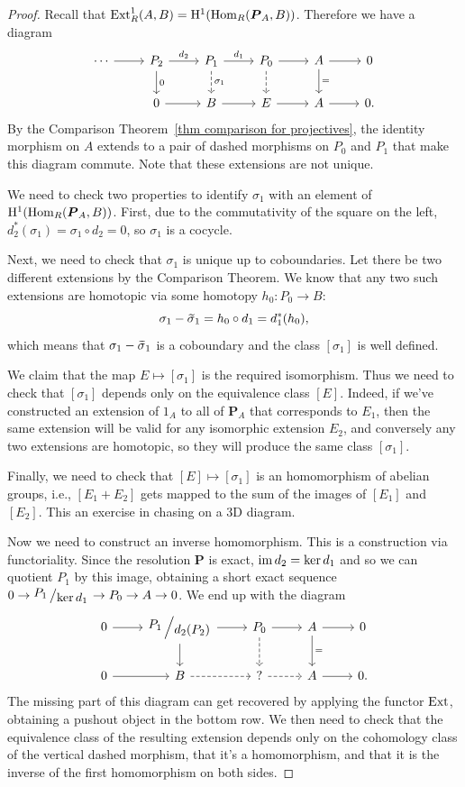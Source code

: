 \begin{proof}
    Recall that $\operatorname{Ext}^1_R(A,B)=\mathrm{H}^1(\operatorname{Hom}_R(\boldsymbol{P}_A,B))$. Therefore we have a diagram
    \[\begin{tikzcd}
        \cdots \arrow[r]&P_2\arrow[r,"d_2"]\arrow[d,"0"] & P_1\arrow[r,"d_1"]\arrow[d,dashed,"\sigma_1"] & P_0 \arrow[r]\arrow[d,dashed] & A\arrow[r]\arrow[d,"="] & 0 \\
        & 0\arrow[r] & B\arrow[r] & E \arrow[r] & A\arrow[r] & 0.
    \end{tikzcd}\]
    By the Comparison Theorem~\ref{thm comparison for projectives}, the identity morphism on $A$ extends to a pair of dashed morphisms on $P_0$ and $P_1$ that make this diagram commute. Note that these extensions are not unique. 

    We need to check two properties to identify $\sigma_1$ with an element of $\mathrm{H}^1(\operatorname{Hom}_R(\boldsymbol{P}_A,B))$. First, due to the commutativity of the square on the left, $d_2^\ast(\sigma_1)=\sigma_1\circ d_2=0$, so $\sigma_1$ is a cocycle. 

    Next, we need to check that $\sigma_1$ is unique up to coboundaries. Let there be two different extensions by the Comparison Theorem. We know that any two such extensions are homotopic via some homotopy $h_0:P_0\to B$:
    \[\sigma_1-\wt{\sigma}_1=h_0\circ d_1=d_1^\ast(h_0),\]
    which means that $\sigma_1-\wt{\sigma}_1$ is a coboundary and the class $[\sigma_1]$ is well defined.

    We claim that the map $E\mapsto [\sigma_1]$ is the required isomorphism. Thus we need to check that $[\sigma_1]$ depends only on the equivalence class $[E]$. Indeed, if we've constructed an extension of $1_A$ to all of $\bm{P}_A$ that corresponds to $E_1$, then the same extension will be valid for any isomorphic extension $E_2$, and conversely any two extensions are homotopic, so they will produce the same class $[\sigma_1]$.

    Finally, we need to check that $[E]\mapsto [\sigma_1]$ is an homomorphism of abelian groups, i.e., $[E_1+E_2]$ gets mapped to the sum of the images of $[E_1]$ and $[E_2]$. This an exercise in chasing on a 3D diagram.

    Now we need to construct an inverse homomorphism. This is a construction via functoriality. Since the resolution $\bm{P}$ is exact, $\operatorname{im} d_2=\ker d_1$ and so we can quotient $P_1$ by this image, obtaining a short exact sequence $0\to \bigslant{P_1}{\ker d_1} \to P_0\to A\to 0$. We end up with the diagram
    \[\begin{tikzcd}
        0\arrow[r] & \bigslant{P_1}{d_2(P_2)}\arrow[r]\arrow[d] & P_0 \arrow[r]\arrow[d,dashed] & A\arrow[r]\arrow[d,"="] & 0 \\
        0\arrow[r] & B\arrow[r,dashed] & ? \arrow[r,dashed] & A\arrow[r] & 0.
    \end{tikzcd}\]
    The missing part of this diagram can get recovered by applying the functor $\operatorname{Ext}$, obtaining a pushout object in the bottom row. We then need to check that the equivalence class of the resulting extension depends only on the cohomology class of the vertical dashed morphism, that it's a homomorphism, and that it is the inverse of the first homomorphism on both sides.
\end{proof}
